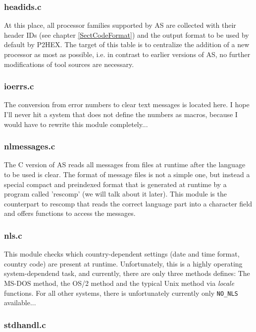 \documentclass[12pt,twoside]{report}
\begin{document}
\subsubsection{headids.c}

At this place, all processor families supported by AS are collected with
their header IDs (see chapter \ref{SectCodeFormat}) and the output format
to be used by default by P2HEX.  The target of this table is to centralize 
the addition of a new processor as most as possible, i.e. in contrast to
earlier versions of AS, no further modifications of tool sources are
necessary.

\subsubsection{ioerrs.c}

The conversion from error numbers to clear text messages is located here. 
I hope I'll never hit a system that does not define the numbers as macros,
because I would have to rewrite this module completely...

\subsubsection{nlmessages.c}

The C version of AS reads all messages from files at runtime after the
language to be used is clear.  The format of message files is not a simple
one, but instead a special compact and preindexed format that is generated 
at runtime by a program called 'rescomp' (we will talk about it later). 
This module is the counterpart to rescomp that reads the correct language
part into a character field and offers functions to access the messages.

\subsubsection{nls.c}

This module checks which country-dependent settings (date and time format,
country code) are present at runtime.  Unfortunately, this is a highly
operating system-dependend task, and currently, there are only three
methods defines: The MS-DOS method, the OS/2 method and the typical Unix
method via {\em locale} functions.  For all other systems, there is
unfortunately currently only \verb!NO_NLS! available...

\subsubsection{stdhandl.c}
\end{document}
